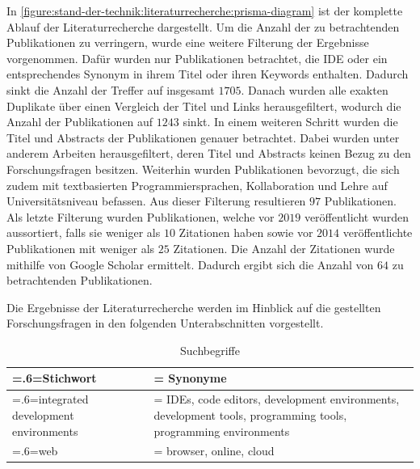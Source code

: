 In \autoref{figure:stand-der-technik:literaturrecherche:prisma-diagram} ist der komplette Ablauf der Literaturrecherche dargestellt. Um die Anzahl der zu betrachtenden Publikationen zu verringern, wurde eine weitere Filterung der Ergebnisse vorgenommen. Dafür wurden nur Publikationen betrachtet, die IDE oder ein entsprechendes Synonym in ihrem Titel oder ihren Keywords enthalten. Dadurch sinkt die Anzahl der Treffer auf insgesamt $1705$. Danach wurden alle exakten Duplikate über einen Vergleich der Titel und Links herausgefiltert, wodurch die Anzahl der Publikationen auf $1243$ sinkt. In einem weiteren Schritt wurden die Titel und Abstracts der Publikationen genauer betrachtet. Dabei wurden unter anderem Arbeiten herausgefiltert, deren Titel und Abstracts keinen Bezug zu den Forschungsfragen besitzen. Weiterhin wurden Publikationen bevorzugt, die sich zudem mit textbasierten Programmiersprachen, Kollaboration und Lehre auf Universitätsniveau befassen. Aus dieser Filterung resultieren $97$ Publikationen. Als letzte Filterung wurden Publikationen, welche vor $2019$ veröffentlicht wurden aussortiert, falls sie weniger als $10$ Zitationen haben sowie vor $2014$ veröffentlichte Publikationen mit weniger als $25$ Zitationen. Die Anzahl der Zitationen wurde mithilfe von Google Scholar \cite{noauthor_google-scholar_nodate} ermittelt. Dadurch ergibt sich die Anzahl von $64$ zu betrachtenden Publikationen.

Die Ergebnisse der Literaturrecherche werden im Hinblick auf die gestellten Forschungsfragen in den folgenden Unterabschnitten vorgestellt.

\begin{table}[tbp]
    \centering
    \begin{tabularx}{\textwidth}{>{\hsize=.6\hsize\linewidth=\hsize}X
            >{\hsize=1.4\hsize\linewidth=\hsize}X}
        \toprule
        Stichwort                           & Synonyme                                                                                                     \\
        \midrule
        integrated development environments & IDEs, code editors, development environments, development tools, programming tools, programming environments \\
        web                                 & browser, online, cloud                                                                                       \\
        \bottomrule
    \end{tabularx}
    \caption{Suchbegriffe}
    \label{table:search-terms}
\end{table}

